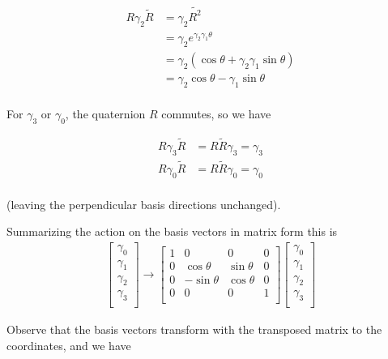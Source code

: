 \begin{align*}
R \gamma_2 \tilde{R}
&=
\gamma_2 \tilde{R^2} \\
&=
\gamma_2 e^{\gamma_2 \gamma_1 \theta} \\
&=
\gamma_2 (\cos\theta + \gamma_2 \gamma_1 \sin\theta) \\
&=
\gamma_2 \cos\theta - \gamma_1 \sin\theta \\
\end{align*}

For $\gamma_3$ or $\gamma_0$, the quaternion $R$ commutes, so we have

\begin{align*}
R \gamma_3 \tilde{R} &= R \tilde{R} \gamma_3 = \gamma_3 \\
R \gamma_0 \tilde{R} &= R \tilde{R} \gamma_0 = \gamma_0 \\
\end{align*}

(leaving the perpendicular basis directions unchanged).

Summarizing the action on the basis vectors in matrix form this is
\begin{align*}
\begin{bmatrix}
\gamma_0 \\
\gamma_1 \\
\gamma_2 \\
\gamma_3 \\
\end{bmatrix}
\rightarrow
\begin{bmatrix}
1 & 0 & 0 & 0 \\
0 & \cos\theta & \sin\theta & 0 \\
0 & -\sin\theta & \cos\theta & 0 \\
0 & 0 & 0 & 1 \\
\end{bmatrix}
\begin{bmatrix}
\gamma_0 \\
\gamma_1 \\
\gamma_2 \\
\gamma_3 \\
\end{bmatrix}
\end{align*}

Observe that the basis vectors transform with the transposed matrix to the coordinates, and we have

